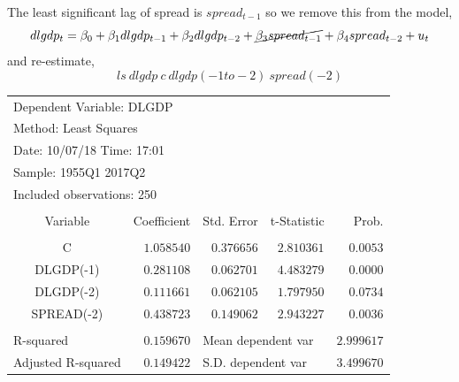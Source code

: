\documentclass[12pt]{report}
\begin{document}
\noindent The least significant lag of spread is $spread_{t-1}$ so we remove this from the model, $$dlgdp_t = \beta_0 + \beta_1dlgdp_{t-1} + \beta_2dlgdp_{t-2} + \cancel{\beta_3spread_{t-1}} + \beta_4spread_{t-2} + u_t$$ and re-estimate,
$$ls\ dlgdp\ c\ dlgdp(-1to-2)\ spread(-2)$$
\begin{table}[H]
	\centering
	\begin{tabular}{lrrrr}
		\multicolumn{3}{l}{Dependent Variable: DLGDP}&\multicolumn{1}{c}{}&\multicolumn{1}{c}{}\\
		\multicolumn{3}{l}{Method: Least Squares}&\multicolumn{1}{c}{}&\multicolumn{1}{c}{}\\
		\multicolumn{3}{l}{Date: 10/07/18   Time: 17:01}&\multicolumn{1}{c}{}&\multicolumn{1}{c}{}\\
		\multicolumn{3}{l}{Sample: 1955Q1 2017Q2}&\multicolumn{1}{c}{}&\multicolumn{1}{c}{}\\
		\multicolumn{3}{l}{Included observations: 250}&\multicolumn{1}{c}{}&\multicolumn{1}{c}{}\\
		[4.5pt] \hline \\ [-4.5pt]
		\multicolumn{1}{c}{Variable}&\multicolumn{1}{r}{Coefficient}&\multicolumn{1}{r}{Std. Error}&\multicolumn{1}{r}{t-Statistic}&\multicolumn{1}{r}{Prob.}\\
		[4.5pt] \hline \\ [-4.5pt]
		\multicolumn{1}{c}{C}&\multicolumn{1}{r}{$1.058540$}&\multicolumn{1}{r}{$0.376656$}&\multicolumn{1}{r}{$2.810361$}&\multicolumn{1}{r}{$0.0053$}\\
		\multicolumn{1}{c}{DLGDP(-1)}&\multicolumn{1}{r}{$0.281108$}&\multicolumn{1}{r}{$0.062701$}&\multicolumn{1}{r}{$4.483279$}&\multicolumn{1}{r}{$0.0000$}\\
		\multicolumn{1}{c}{DLGDP(-2)}&\multicolumn{1}{r}{$0.111661$}&\multicolumn{1}{r}{$0.062105$}&\multicolumn{1}{r}{$1.797950$}&\multicolumn{1}{r}{$0.0734$}\\
		\multicolumn{1}{c}{SPREAD(-2)}&\multicolumn{1}{r}{$0.438723$}&\multicolumn{1}{r}{$0.149062$}&\multicolumn{1}{r}{$2.943227$}&\multicolumn{1}{r}{$0.0036$}\\
		[4.5pt] \hline \\ [-4.5pt]
		\multicolumn{1}{l}{R-squared}&\multicolumn{1}{r}{$0.159670$}&\multicolumn{2}{l}{Mean dependent var}&\multicolumn{1}{r}{$2.999617$}\\
		\multicolumn{1}{l}{Adjusted R-squared}&\multicolumn{1}{r}{$0.149422$}&\multicolumn{2}{l}{S.D. dependent var}&\multicolumn{1}{r}{$3.499670$}\\

\end{tabular}
\end{table}
\end{document}
